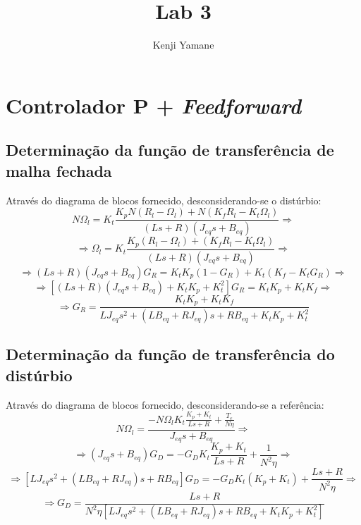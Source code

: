 \documentclass{article}[twocolumn]
\title{Lab 3}
\author{Kenji Yamane}
\begin{document}
	\maketitle
	\section{Controlador P + \textit{Feedforward}}
	\subsection{Determina\c{c}\~ao da fun\c{c}\~ao de transfer\^encia de malha fechada}
	Atrav\'es do diagrama de blocos fornecido, desconsiderando-se o dist\'urbio:
	\begin{equation}
		N\Omega_l = K_t\frac{K_pN(R_l - \Omega_l) + N(K_fR_l - K_t\Omega_l)}
		{(Ls + R)(J_{eq}s + B_{eq})} \Rightarrow
		\nonumber
	\end{equation}
	\begin{equation}
		\Rightarrow \Omega_l = K_t\frac{K_p(R_l - \Omega_l) + (K_fR_l - K_t\Omega_l)}
		{(Ls + R)(J_{eq}s + B_{eq})} \Rightarrow
		\nonumber
	\end{equation}
	\begin{equation}
		\Rightarrow
		(Ls + R)(J_{eq}s + B_{eq})G_R = K_tK_p(1 - G_R) + K_t(K_f - K_tG_R) \Rightarrow
		\nonumber
	\end{equation}
	\begin{equation}
		\Rightarrow [(Ls + R)(J_{eq}s + B_{eq}) + K_tK_p + K_t^2]G_R = K_tK_p + K_tK_f
		\Rightarrow
		\nonumber
	\end{equation}
	\begin{equation}
		\Rightarrow G_R = \frac{K_tK_p + K_tK_f}
		{LJ_{eq}s^2 + (LB_{eq} + RJ_{eq})s + RB_{eq} + K_tK_p + K_t^2}
		\nonumber
	\end{equation}
	\subsection{Determina\c{c}\~ao da fun\c{c}\~ao de transfer\^encia do dist\'urbio}
	Atrav\'es do diagrama de blocos fornecido, desconsiderando-se a refer\^encia:
	\begin{equation}
		N\Omega_l = \frac{-N\Omega_lK_t\frac{K_p + K_t}
		{Ls + R} + \frac{T_e}{N\eta}}{J_{eq}s + B_{eq}} \Rightarrow
		\nonumber
	\end{equation}
	\begin{equation}
		\Rightarrow (J_{eq}s + B_{eq})G_D = -G_DK_t\frac{K_p + K_t}
		{Ls + R} + \frac{1}{N^2\eta} \Rightarrow
		\nonumber
	\end{equation}
	\begin{equation}
		\Rightarrow [LJ_{eq}s^2 + (LB_{eq} + RJ_{eq})s + RB_{eq}]G_D = -G_DK_t(K_p + K_t) +
		\frac{Ls + R}{N^2\eta} \Rightarrow
		\nonumber
	\end{equation}
	\begin{equation}
		\Rightarrow G_D = \frac{Ls + R}
		{N^2\eta[LJ_{eq}s^2 + (LB_{eq} + RJ_{eq})s + RB_{eq} + K_tK_p + K_t^2]}
		\nonumber
	\end{equation}
\end{document}
